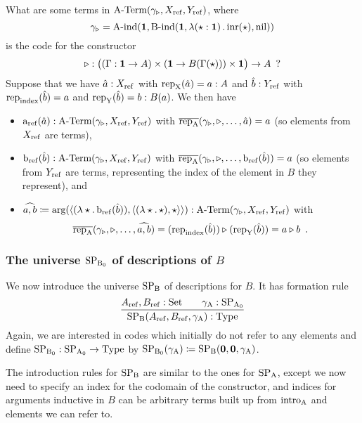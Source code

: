 \documentclass{article}
\begin{document}
\begin{example}
  What are some terms in $\text{A-Term}(\gamma_{\triangleright}, X_{\mathrm{ref}}, Y_{\mathrm{ref}})$, where
  \[
  \gamma_{\triangleright} = \text{A-ind}(\mathbf{1}, \text{B-ind}(\mathbf{1},
  \lambda (\star : \mathbf{1})\,.\,\text{inr}(\star), \text{nil}))
  \]
  is the code for the constructor
  \[
  \triangleright : \big((\Gamma : \mathbf{1} \to A) \times (\mathbf{1} \to B(\Gamma(\star))) \times \mathbf{1}\big) \to A \enspace ?
  \]
  Suppose that we have $\hat{a} : X_{\mathrm{ref}}$ with $\text{rep}_{\mathrm{X}}(\hat{a}) = a : A$
  and $\hat{b} : Y_{\mathrm{ref}}$ with $\text{rep}_{\mathrm{index}}(\hat{b}) = a$ and
  $\text{rep}_{\mathrm{Y}}(\hat{b}) = b : B(a)$. We then have 
  \begin{itemize}
  \item $\text{a}_{\mathrm{ref}}(\hat{a}) : \text{A-Term}(\gamma_{\triangleright}, X_{\mathrm{ref}}, Y_{\mathrm{ref}})$ with
  $\overline{\text{rep}_{\mathrm{A}}}(\gamma_{\triangleright}, \triangleright, \ldots, \hat{a}) =
  a$ (so elements from $X_{\mathrm{ref}}$ are terms),
\item $\text{b}_{\mathrm{ref}}(\hat{b}) :  \text{A-Term}(\gamma_{\triangleright}, X_{\mathrm{ref}}, Y_{\mathrm{ref}})$ with
  $\overline{\text{rep}_{\mathrm{A}}}(\gamma_{\triangleright}, \triangleright, \ldots,
  \text{b}_{\mathrm{ref}}(\hat{b})) = a$ (so elements from $Y_{\mathrm{ref}}$ are terms,
  representing the index of the element in $B$ they represent), and
\item  $\widehat{a,b} \coloneqq \text{arg}(\langle (\lambda \star.\,\text{b}_{\mathrm{ref}}(\hat{b})) ,
  \langle (\lambda \star.\,\star), \star\rangle\rangle) :
  \text{A-Term}(\gamma_{\triangleright}, X_{\mathrm{ref}}, Y_{\mathrm{ref}})$ with
  \[
      \overline{\text{rep}_{\mathrm{A}}}(\gamma_{\triangleright}, \triangleright, \ldots, \widehat{a,b})
    = (\text{rep}_{\mathrm{index}}(\hat{b})) \triangleright (\text{rep}_{\mathrm{Y}}(\hat{b})) 
    = a \triangleright b \enspace .
  \]
\blackqed
\end{itemize}
\end{example}

\subsubsection{The universe $\text{SP}_{\mathrm{B}_0}$ of descriptions of $B$}
\label{sec:SPB}

We now introduce the universe $\text{SP}_{\mathrm{B}}$ of descriptions
for $B$. It has formation rule
%
\[
\infer{\SPB(\Aref, \Bref, \gammaA) : \TYPE}{\Aref, \Bref : \Set & \quad \gammaA : \SPAp}
\]
%
Again, we are interested in codes which initially do not refer to
any elements and define $\text{SP}_{\mathrm{B}_0} : \text{SP}_{\mathrm{A}_0} \to \text{Type}$ by $\text{SP}_{\mathrm{B}_0}(\gamma_{\mathrm{A}})
\coloneqq \text{SP}_{\mathrm{B}}(\mathbf{0}, \mathbf{0}, \gamma_{\mathrm{A}})$.

The introduction rules for $\text{SP}_{\mathrm{B}}$ are similar to the ones for $\text{SP}_{\mathrm{A}}$,
except we now need to specify an index for the codomain of the
constructor, and indices for arguments inductive in $B$ can be
arbitrary terms built up from $\text{intro}_{\mathrm{A}}$ and elements we can refer to.
\end{document}
